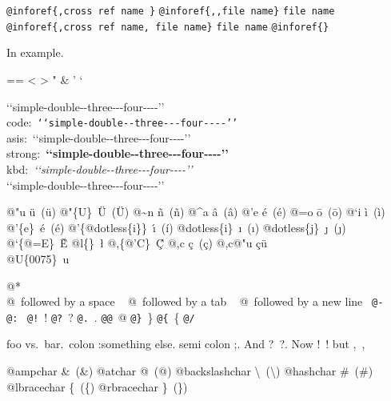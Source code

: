 \documentclass{book}
\makeatletter
\newcommand\Texinfocommandstyletextkbd[1]{{\ttfamily\textsl{#1}}}%
\newenvironment{Texinfopreformatted}{%
  \par\GNUTobeylines\obeyspaces\frenchspacing\parskip=\z@\parindent=\z@}{}
{\catcode`\^^M=13 \gdef\GNUTobeylines{\catcode`\^^M=13 \def^^M{\null\par}}}
\newenvironment{Texinfoindented}{\begin{list}{}{}\item\relax}{\end{list}}
\renewcommand{\_}{\Texinfounderscore\discretionary{}{}{}}
\makeatother
\begin{document}
\texttt{@inforef\{,cross ref name \}} 
\texttt{@inforef\{{,}{,}file name\}} \texttt{file name}
\texttt{@inforef\{,cross ref name,\ file name\}} \texttt{file name}
\texttt{@inforef\{\}} 



In example.
\begin{Texinfoindented}
\begin{Texinfopreformatted}%
\ttfamily 
<
>
"
\&
'
`

{`}{`}simple-double{-}{-}three{-}{-}{-}four{-}{-}{-}-{'}{'}\leavevmode{}\\
code:\ \texttt{{`}{`}simple-double{-}{-}three{-}{-}{-}four{-}{-}{-}-{'}{'}}\ \leavevmode{}\\
asis:\ {`}{`}simple-double{-}{-}three{-}{-}{-}four{-}{-}{-}-{'}{'}\ \leavevmode{}\\
strong:\ \textbf{{`}{`}simple-double{-}{-}three{-}{-}{-}four{-}{-}{-}-{'}{'}}\ \leavevmode{}\\
kbd:\ \Texinfocommandstyletextkbd{{`}{`}simple-double{-}{-}three{-}{-}{-}four{-}{-}{-}-{'}{'}}\ \leavevmode{}\\

`\hbox{}`simple-double-\hbox{}-three{-}{-}{-}four{-}{-}{-}-'\hbox{}'\leavevmode{}\\

%
%
%
%

@"u \"{u}\ (ü)
@"\{U\}\ \"{U}\ (Ü) 
@\~{}n \~{n}\ (ñ)
@\^{}a \^{a}\ (â)
@'e \'{e}\ (é)
@=o \={o}\ (ō)
@`i \`{i}\ (ì)
@'\{e\}\ \'{e}\ (é)
@'\{@dotless\{i\}\}\ \'{\i{}}\ (í)
@dotless\{i\}\ \i{}\ (ı)
@dotless\{j\}\ \j{}\ (ȷ)
@`\{@=E\}\ \`{\={E}}
@l\{\}\ \l{}
@,\{@'C\}\ \c{\'{C}}
@,c \c{c}\ (ç)
@,c@"u \c{c}\"{u}\ \leavevmode{}\\

@U\{0075\}\ u

@* \leavevmode{}\\
@\ followed by a space
\ {}
@\ followed by a tab
\ {}
@\ followed by a new line
\ {}\texttt{@-}\ \-{}
\texttt{@:}\ \@
\texttt{@!}\ \@!
\texttt{@?}\ \@?
\texttt{@.}\ \@.
\texttt{@@}\ @
\texttt{@\}}\ \}
\texttt{@\{}\ \{
\texttt{@/}\ 

foo vs.\@\ bar.\ 
colon :\@And something else.
semi colon ;\@.
And ?\ ?\@.
Now !\ !\@@
but ,\ ,\@

@ampchar \&\ (\&)
@atchar @\ (@)
@backslashchar \textbackslash{}\ (\textbackslash{})
@hashchar \#\ (\#)
@lbracechar \{\ (\{)
@rbracechar \}\ (\})


\end{Texinfopreformatted}
\end{Texinfoindented}
\end{document}
